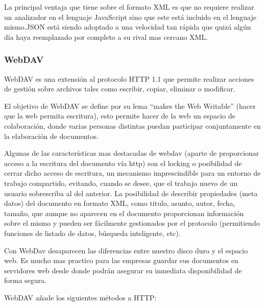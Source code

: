 La principal ventaja que tiene sobre el formato XML es que no requiere realizar un analizador en el lenguaje JavaScript sino que este está incluido en el lenguaje mismo.\newline JSON está siendo adoptado a una velocidad tan rápida que quizá algún día haya reemplazado por completo a su rival mas cercano XML.


\subsubsection*{WebDAV}
\label{tec:webdav}

WebDAV es una extensión al protocolo HTTP 1.1 que permite realizar acciones de gestión sobre archivos tales como escribir, copiar, eliminar o modificar.

El objetivo de WebDAV se define por su lema ``makes the Web Writable'' (hacer que la web permita escritura), esto permite hacer de la web un espacio de colaboración, donde varias personas distintas puedan participar conjuntamente en la elaboración de documentos.

Algunas de las características mas destacadas de webdav (aparte de proporcionar acceso a la escritura del documento vía http) son el locking o posibilidad de cerrar dicho acceso de escritura, un mecanismo imprescindible para un entorno de trabajo compartido, evitando, cuando se desee, que el trabajo nuevo de un usuario sobrescriba al del anterior. La posibilidad de describir propiedades (meta datos) del documento en formato XML, como titulo, asunto, autor, fecha, tamaño, que aunque no aparecen en el documento proporcionan información sobre el mismo y pueden ser fácilmente gestionados por el protocolo (permitiendo funciones de listado de datos, búsqueda inteligente, etc).

Con WebDav desaparecen las diferencias entre nuestro disco duro y el espacio web. Es mucho mas practico para las empresas guardar sus documentos en servidores web desde donde podrán asegurar su inmediata disponibilidad de forma segura.

WebDAV añade los siguientes métodos a HTTP:

